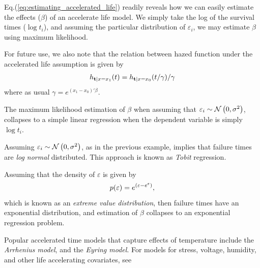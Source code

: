 Eq.(\ref{eq:estimating_accelerated_life}) readily reveals how we can easily estimate the effects ($\beta$) of an accelerate life model.
We simply take the log of the survival times ($\log t_i$), and assuming the particular distribution of $\varepsilon_i$, we may estimate $\beta$ using maximum likelihood.

For future use, we also note that the relation between hazed function under the accelerated life assumption is given by
\begin{align}
\label{eq:hazard_accelerated_life}
		h_{\mathbf{t}|x=x_1} (t)=h_{\mathbf{t}|x=x_0} (t/\gamma)/ \gamma
\end{align}
where as usual $\gamma=e^{(x_1-x_0)'\beta}$.


\begin{example}
\label{eg:accelerated_gaussian}
The maximum likelihood estimation of $\beta$ when assuming that $\varepsilon_i \sim \mathcal{N}\left(0,\sigma^2\right)$, collapses to a simple linear regression when the dependent variable is simply $\log t_i$.
\end{example}


\begin{extra}
Assuming $\varepsilon_i \sim \mathcal{N}\left(0,\sigma^2\right)$, as in the previous example, implies that failure times are \emph{log normal} distributed. 
This approach is known as \emph{Tobit} regression.
\end{extra}


\begin{extra}
\label{eg:accelerated_exponential}
Assuming that the density of $\varepsilon$ is given by 
$$
	p(\varepsilon)=e^{(\varepsilon-e^\varepsilon)}, 
$$
which is known as an \emph{extreme value distribution}, then failure times have an exponential distribution, and estimation of $\beta$ collapses to an exponential regression problem.
\end{extra}



\begin{extra}
Popular accelerated time models that capture effects of temperature include the \emph{Arrhenius model}, and the \emph{Eyring model}.
For models for stress, voltage, humidity, and other life accelerating covariates, see \cite[Sec.8.1.5]{natrella_nist/sematech_2010}
\end{extra}






